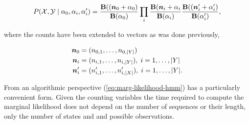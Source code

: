 \documentclass[12pt]{report}
\newcommand{\p}[0]{\prime}
\newcommand{\1}[0]{\mathbbm{1}}
\newcommand{\Bf}[0]{\text{\textbf{B}}}
\DeclarePairedDelimiter\abs{\lvert}{\rvert}%
\begin{document}
\begin{equation}
    P(\mathcal{X}, \mathcal{Y} \mid \alpha_0, \alpha_i, \alpha_i^\prime)
    = \frac{\Bf((\bm{n}_0 + \alpha_0)}{\Bf(\alpha_0)}
    \prod_i \frac{\Bf{(\bm{n}_i + \alpha_i}}{\Bf(\alpha_i)}
    \frac{\Bf((\bm{n}_i^\p + \alpha_i^\p)}{\Bf(\alpha_i^\p)},
    \label{eq:marg-likelihood-hmm}
\end{equation}

where the counts have been extended to vectors as was done previously,

\begin{align*}
    \bm{n}_0 &= (n_{0,1}, \ldots, n_{0,\abs{Y}}) \\
    \bm{n}_i &= (n_{i,1}, \ldots, n_{i,\abs{Y}}),\; i = 1, \ldots, \abs{Y} \\
    \bm{n}_i^\p &= (n_{i,1}^\p, \ldots, n_{i,\abs{X}}^\p),\; i = 1, \ldots, \abs{Y}. \\
\end{align*}

From an algorithmic perspective (\ref{eq:marg-likelihood-hmm}) has a particularly convenient
form. Given the counting variables the time required to compute the marginal likelihood does not
depend on the number of sequences or their length, only the number of states and and possible observations.
\end{document}
